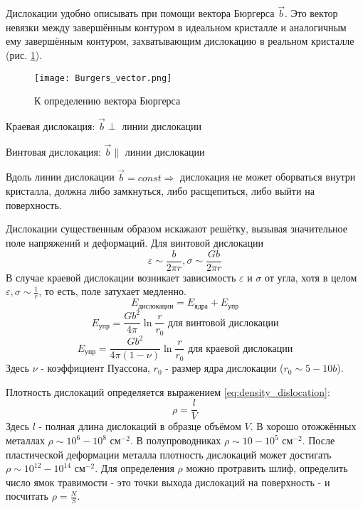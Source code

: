 \par
Дислокации удобно описывать при помощи вектора Бюргерса $\vec{b}$. Это вектор невязки между завершённым контуром в идеальном кристалле и аналогичным ему завершённым контуром, захватывающим дислокацию в реальном кристалле (рис. {\ref{fig:Burgers_vector}}).
\begin{figure}[h!]
\centering
\texttt{[image: Burgers\_vector.png]}\caption{К определению вектора Бюргерса} \label{fig:Burgers_vector}
\end{figure} 
\par
Краевая дислокация: $\vec{b}\perp$ линии дислокации\par
Винтовая дислокация: $\vec{b}\parallel$ линии дислокации\par
Вдоль линии дислокации $\vec{b}=const\Rightarrow$ дислокация не может оборваться внутри кристалла, должна либо замкнуться, либо расщепиться, либо выйти на поверхность.\par
Дислокации существенным образом искажают решётку, вызывая значительное поле напряжений и деформаций. Для винтовой дислокации 
\begin{equation}
    \varepsilon \sim \frac{b}{2\pi r}, \sigma \sim \frac{Gb}{2\pi r}
\label{eq:dislocation_force_field} %
\end{equation}
В случае краевой дислокации возникает зависимость $\varepsilon$ и $\sigma$ от угла, хотя в целом $\varepsilon, \sigma \sim \frac{1}{r}$, то есть, поле затухает медленно.
\begin{equation}
   E_{\text{дислокации}}=E_{\text{ядра}}+E_{\text{упр}}
\label{eq:dislocation_energetics} 
\end{equation}
\begin{equation}
   E_{\text{упр}}=\frac{Gb^2}{4\pi}\ln \frac{r}{r_0} \text{ для винтовой дислокации}
\label{eq:screw_dislocation_energetics} 
\end{equation}
\begin{equation}
   E_{\text{упр}}=\frac{Gb^2}{4\pi(1-\nu)}\ln \frac{r}{r_0} \text{ для краевой дислокации}
\label{eq:edge_dislocation_energetics} 
\end{equation}
Здесь $\nu$ - коэффициент Пуассона, $r_0$ - размер ядра дислокации ($r_0 \sim 5-10 b$). \par
Плотность дислокаций определяется выражением \ref{eq:density_dislocation}:
\begin{equation}
   \rho=\frac{l}{V}
\label{eq:density_dislocation} 
\end{equation}
Здесь $l$ - полная длина дислокаций в образце объёмом $V$. В хорошо отожжённых металлах $\rho \sim 10^6-10^8$ см$^{-2}$. В полупроводниках $\rho \sim 10-10^5$ см$^{-2}$. После пластической деформации металла плотность дислокаций может достигать $\rho \sim 10^12-10^14$ см$^{-2}$. Для определения $\rho$ можно протравить шлиф, определить число ямок травимости - это точки выхода дислокаций на поверхность - и посчитать $\rho=\frac{N}{S}$.
